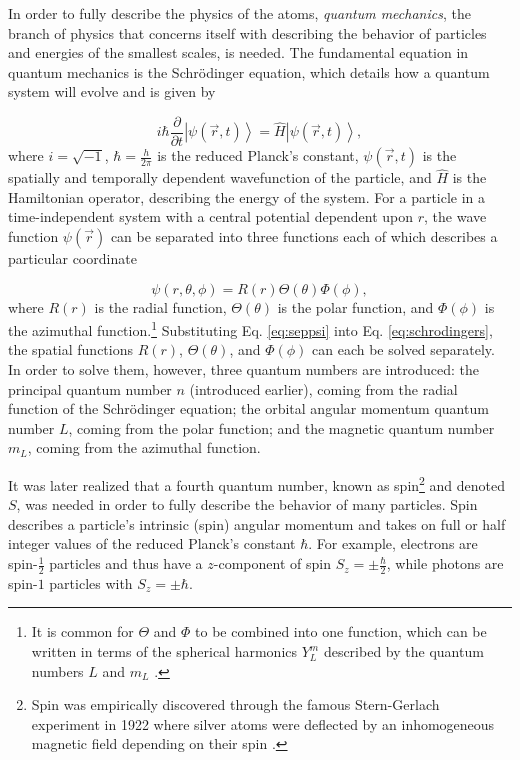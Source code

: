 In order to fully describe the physics of the atoms, \textit{quantum mechanics}, the branch of physics that concerns itself with describing the behavior of particles and energies of the smallest scales, is needed. The fundamental equation in quantum mechanics is the Schr\"{o}dinger equation, which details how a quantum system will evolve and is given by

\begin{equation}
	i \hbar \frac{\partial}{\partial t} \left| \psi(\vec r,t) \right> = \hat H \left| \psi (\vec r,t)\right>,
	\label{eq:schrodingers}
\end{equation}
%
where $i = \sqrt{-1}$, $\hbar = \frac{h}{ 2 \pi}$ is the reduced Planck's constant, $\psi (\vec r,t)$ is the spatially and temporally dependent wavefunction of the particle, and $\hat H$ is the Hamiltonian operator, describing the energy of the system. For a particle in a time-independent system with a central potential dependent upon $r$, the wave function $\psi (\vec r)$ can be separated into three functions each of which describes a particular coordinate 

\begin{equation}
	\psi(r, \theta, \phi) = R(r) \Theta(\theta) \Phi(\phi), 
	\label{eq:seppsi}
\end{equation}
%
where $R(r)$ is the radial function, $\Theta(\theta)$ is the polar function, and $\Phi(\phi)$ is the azimuthal function.\footnote{It is common for $\Theta$ and $\Phi$ to be combined into one function, which can be written in terms of the spherical harmonics $Y^m _L$ described by the quantum numbers $L$ and $m_L$ \cite{Townsend}.} Substituting Eq. \ref{eq:seppsi} into Eq. \ref{eq:schrodingers}, the spatial functions $R(r)$, $\Theta(\theta)$, and $\Phi(\phi)$ can each be solved separately. In order to solve them, however, three quantum numbers are introduced: the principal quantum number $n$ (introduced earlier), coming from the radial function of the Schr\"{o}dinger equation; the orbital angular momentum quantum number $L$, coming from the polar function; and the magnetic quantum number $m_L$, coming from the azimuthal function.


It was later realized that a fourth quantum number, known as spin\footnote{Spin was empirically discovered through the famous Stern-Gerlach experiment in 1922 where silver atoms were deflected by an inhomogeneous magnetic field depending on their spin \cite{Townsend}.} and denoted $S$, was needed in order to fully describe the behavior of many particles. Spin describes a particle's intrinsic (spin) angular momentum and takes on full or half integer values of the reduced Planck's constant $\hbar$. For example, electrons are spin-$\frac{1}{2}$ particles and thus have a $z$-component of spin $S_z = \pm \frac{\hbar}{2}$, while photons are spin-$1$ particles with $S_z = \pm \hbar$. 

